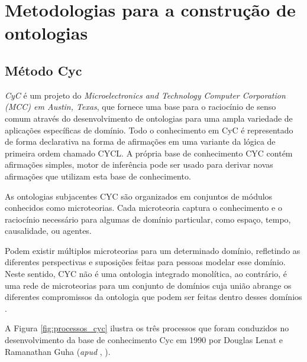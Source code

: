 \section{Metodologias para a construção de ontologias}

\subsection{Método Cyc}

 \textit{CyC} é um projeto do \textit{Microelectronics and Technology Computer Corporation (MCC) em Austin, Texas},
 que fornece uma base para o raciocínio de senso comum através do desenvolvimento de ontologias para uma ampla 
 variedade de aplicações específicas de domínio. Todo o conhecimento em CyC é representado de forma declarativa na 
 forma de afirmações em uma variante da lógica de primeira ordem chamado CYCL. A própria base de conhecimento CYC 
 contém afirmações simples, motor de inferência pode ser usado para derivar novas afirmações que utilizam esta base
 de conhecimento.
 
As ontologias subjacentes CYC são organizados em conjuntos de módulos conhecidos como microteorias. Cada microteoria
captura o conhecimento e o raciocínio necessário para algumas de domínio particular, como espaço, tempo, causalidade,
ou agentes.

Podem existir múltiplos microteorias para um determinado domínio, refletindo as diferentes perspectivas e suposições
feitas para pessoas modelar esse domínio. Neste sentido, CYC não é uma ontologia integrado monolítica, ao contrário,
é uma rede de microteorias para um conjunto de domínios cuja união abrange os diferentes compromissos da ontologia que
podem ser feitas dentro desses domínios \cite{Andreia2010}.

A Figura \ref{fig:processos_cyc} ilustra os três processos que foram conduzidos no desenvolvimento da
base de conhecimento Cyc em 1990 por Douglas Lenat e Ramanathan Guha
(\textit{apud} \citeauthor{DanielaLucas2008}, \citeyear{DanielaLucas2008}).


